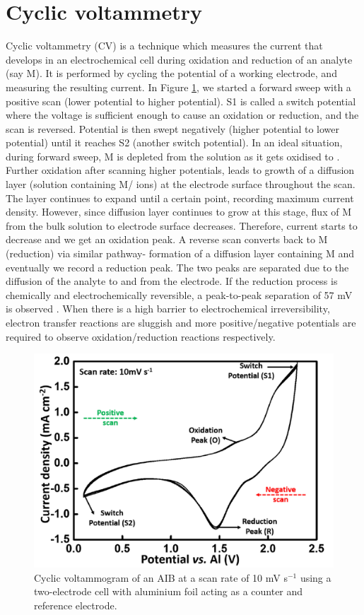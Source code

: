 \section{Cyclic voltammetry}
Cyclic voltammetry (CV) is a technique which measures the current that develops in an electrochemical cell during oxidation and reduction of an analyte (say M). It is performed by cycling the potential of a working electrode, and measuring the resulting current. In Figure \ref{Figures/chap2fig:CV}, we started a forward sweep with a positive scan (lower potential to higher potential). S1 is called a switch potential where the voltage is sufficient enough to cause an oxidation or reduction, and the scan is reversed. Potential is then swept negatively (higher potential to lower potential) until it reaches S2 (another switch potential). In an ideal situation, during forward sweep, M is depleted from the solution as it gets oxidised to . Further oxidation after scanning higher potentials, leads to growth of a diffusion layer (solution containing M/ ions) at the electrode surface throughout the scan. The layer continues to expand until a certain point, recording maximum current density. However, since diffusion layer continues to grow at this stage, flux of M from the bulk solution to electrode surface decreases. Therefore, current starts to decrease and we get an oxidation peak. A reverse scan converts  back to M (reduction) via similar pathway- formation of a diffusion layer containing M and eventually we record a reduction peak. The two peaks are separated due to the diffusion of the analyte to and from the electrode. If the reduction process is chemically and electrochemically reversible, a peak-to-peak separation of 57 mV is observed \cite{bard_electrochemical_1980}. When there is a high barrier to electrochemical irreversibility, electron transfer reactions are sluggish and more positive/negative potentials are required to observe oxidation/reduction reactions respectively. 

\begin{figure}[tbh!]
\centering
\includegraphics[width=\textwidth]{Figures/chap2fig/CV}
\caption{Cyclic voltammogram of an AIB at a scan rate of 10 mV s$^{-1}$ using a two-electrode cell with aluminium foil acting as a counter and reference electrode.}
\label{Figures/chap2fig:CV}
\end{figure}

